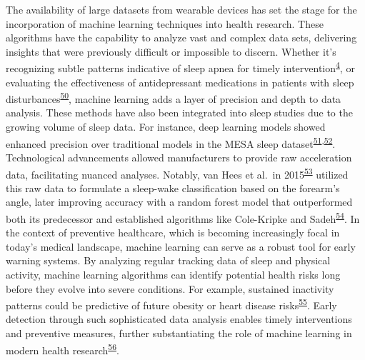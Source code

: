 \documentclass[
  9pt,
]{scrbook}
\begin{document}
The availability of large datasets from wearable devices has set the
stage for the incorporation of machine learning techniques into health
research. These algorithms have the capability to analyze vast and
complex data sets, delivering insights that were previously difficult or
impossible to discern. Whether it's recognizing subtle patterns
indicative of sleep apnea for timely
intervention\textsuperscript{\protect\hyperlink{ref-cappuccio_sleep_2010}{4}},
or evaluating the effectiveness of antidepressant medications in
patients with sleep
disturbances\textsuperscript{\protect\hyperlink{ref-paruthi_consensus_2016}{50}},
machine learning adds a layer of precision and depth to data analysis.
These methods have also been integrated into sleep studies due to the
growing volume of sleep data. For instance, deep learning models showed
enhanced precision over traditional models in the MESA sleep
dataset\textsuperscript{\protect\hyperlink{ref-lutsey_objectively_2015}{51},\protect\hyperlink{ref-palotti_benchmark_2019}{52}}.
Technological advancements allowed manufacturers to provide raw
acceleration data, facilitating nuanced analyses. Notably, van Hees et
al.~in 2015\textsuperscript{\protect\hyperlink{ref-hees_novel_2015}{53}}
utilized this raw data to formulate a sleep-wake classification based on
the forearm's angle, later improving accuracy with a random forest model
that outperformed both its predecessor and established algorithms like
Cole-Kripke and
Sadeh\textsuperscript{\protect\hyperlink{ref-sundararajan_sleep_2021}{54}}.
In the context of preventive healthcare, which is becoming increasingly
focal in today's medical landscape, machine learning can serve as a
robust tool for early warning systems. By analyzing regular tracking
data of sleep and physical activity, machine learning algorithms can
identify potential health risks long before they evolve into severe
conditions. For example, sustained inactivity patterns could be
predictive of future obesity or heart disease
risks\textsuperscript{\protect\hyperlink{ref-tremblay_sedentary_2017}{55}}.
Early detection through such sophisticated data analysis enables timely
interventions and preventive measures, further substantiating the role
of machine learning in modern health
research\textsuperscript{\protect\hyperlink{ref-liguori_evolving_2023}{56}}.
\end{document}
